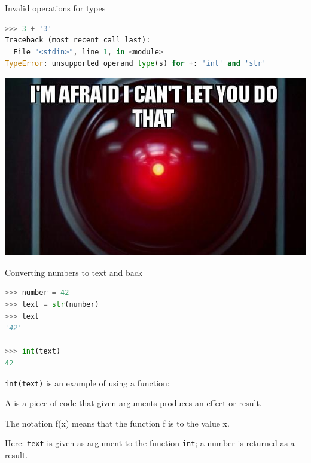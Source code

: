 \documentclass[aspectratio=169,usenames,dvipsnames]{beamer}
\begin{document}
\begin{frame}[fragile]{Invalid operations for types}
\begin{lstlisting}[language=python]
>>> 3 + '3'
Traceback (most recent call last):
  File "<stdin>", line 1, in <module>
TypeError: unsupported operand type(s) for +: 'int' and 'str'
\end{lstlisting}
    
    \centering
    \includegraphics[height=0.5\textheight]{fig/cantdothat}
\end{frame}
    

\begin{frame}[fragile]{Converting numbers to text and back}
\begin{lstlisting}[language=python]
>>> number = 42
>>> text = str(number)
>>> text
'42'

>>> int(text)
42
\end{lstlisting}

    \texttt{int(text)} is an example of using a function:

    \begin{definition}
        A  is a piece of code that given arguments
        produces an effect or result.

        The notation f(x) means that the function f is 
        to the value x.
    \end{definition}

    \pause
    Here: \texttt{text} is given as argument to the function \texttt{int};
    a number is returned as a result.
\end{frame}


\end{document}
